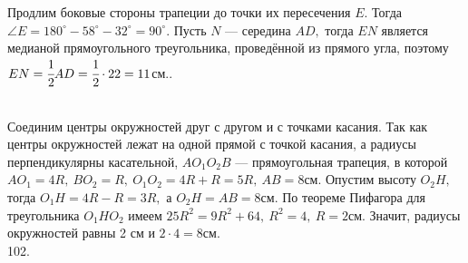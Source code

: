 \documentclass[12pt]{article}
\begin{document}
Продлим боковые стороны трапеции до точки их пересечения $E.$ Тогда $\angle E=180^\circ-58^\circ-32^\circ=90^\circ.$ Пусть $N$ --- середина $AD,$ тогда $EN$ является медианой прямоугольного треугольника, проведённой из прямого угла, поэтому $EN=\cfrac{1}{2}AD=\cfrac{1}{2}\cdot22=11$см.\newpage{}. \begin{figure}[ht!]
\end{figure}\\
Соединим центры окружностей друг с другом и с точками касания. Так как центры окружностей лежат на одной прямой с точкой касания, а радиусы перпендикулярны касательной, $AO_1O_2B$ --- прямоугольная трапеция, в которой $AO_1=4R,\ BO_2=R,\ O_1O_2=4R+R=5R,\ AB=8$см. Опустим высоту $O_2H,$ тогда $O_1H=4R-R=3R,$ а $O_2H=AB=8$см. По теореме Пифагора для треугольника $O_1HO_2$ имеем $25R^2=9R^2+64,\ R^2=4,\ R=2$см. Значит, радиусы окружностей равны 2 см и $2\cdot4=8$см.\\
102. \begin{figure}[ht!]
\end{figure}\\
\end{document}
